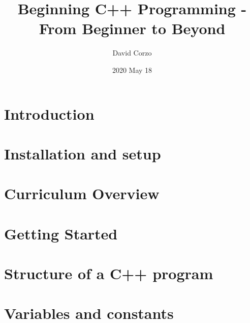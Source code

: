 \documentclass[openany]{book}
\title{Beginning C++ Programming - From Beginner to Beyond}
\date{2020 May 18} %
\author{David Corzo}
\begin{document}
\maketitle
\tableofcontents

\chapter{Introduction}


\chapter{Installation and setup}


\chapter{Curriculum Overview}


\chapter{Getting Started}


\chapter{Structure of a C++ program}


\chapter{Variables and constants}



% 

% 

% 
\end{document}
